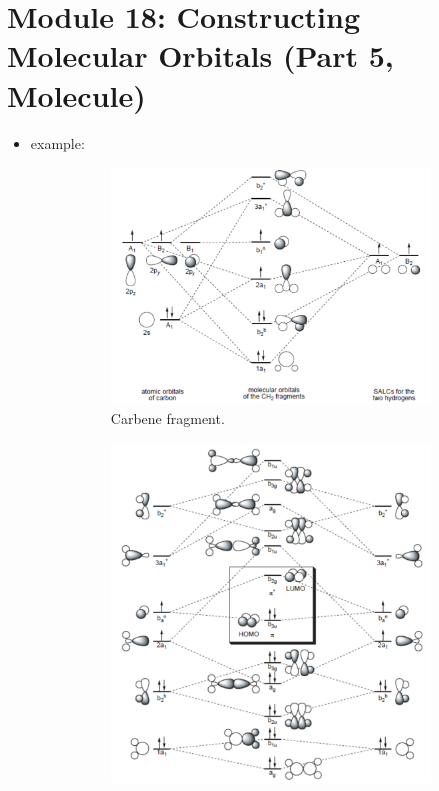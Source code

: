 \documentclass[../notes.tex]{subfiles}
\begin{document}
\section{Module 18: Constructing Molecular Orbitals (Part 5,  Molecule)}
\begin{itemize}
    \item {} example:
    \begin{figure}[h!]
        \centering
        \begin{subfigure}[b]{0.49\linewidth}
            \centering
            \includegraphics[width=0.9\linewidth]{../ExtFiles/orbitalDiagram-C2H4a.png}
            \caption{Carbene fragment.}
            \label{fig:orbitalDiagram-C2H4a}
        \end{subfigure}
        \begin{subfigure}[b]{0.49\linewidth}
            \centering
            \includegraphics[width=0.7\linewidth]{../ExtFiles/orbitalDiagram-C2H4b.png}

\end{subfigure}
\end{figure}
\end{itemize}
\end{document}

